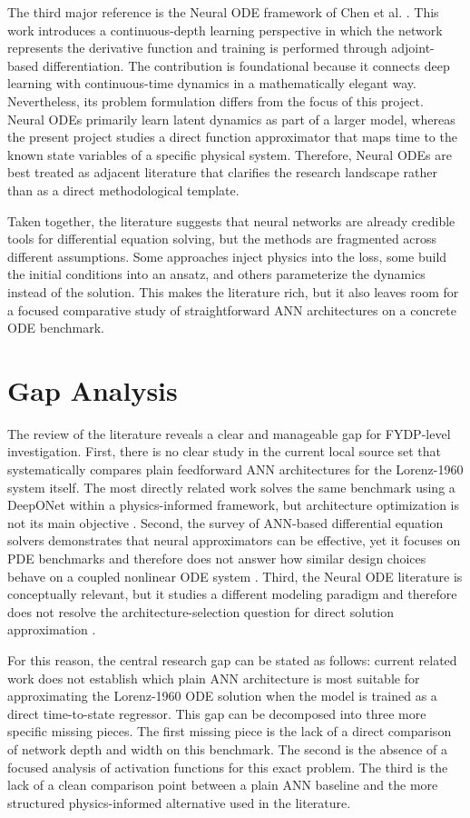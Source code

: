 The third major reference is the Neural ODE framework of Chen et al. \cite{chen2019neural}. This work introduces a continuous-depth learning perspective in which the network represents the derivative function and training is performed through adjoint-based differentiation. The contribution is foundational because it connects deep learning with continuous-time dynamics in a mathematically elegant way. Nevertheless, its problem formulation differs from the focus of this project. Neural ODEs primarily learn latent dynamics as part of a larger model, whereas the present project studies a direct function approximator that maps time to the known state variables of a specific physical system. Therefore, Neural ODEs are best treated as adjacent literature that clarifies the research landscape rather than as a direct methodological template.

Taken together, the literature suggests that neural networks are already credible tools for differential equation solving, but the methods are fragmented across different assumptions. Some approaches inject physics into the loss, some build the initial conditions into an ansatz, and others parameterize the dynamics instead of the solution. This makes the literature rich, but it also leaves room for a focused comparative study of straightforward ANN architectures on a concrete ODE benchmark.

\section{Gap Analysis}
The review of the literature reveals a clear and manageable gap for FYDP-level investigation. First, there is no clear study in the current local source set that systematically compares plain feedforward ANN architectures for the Lorenz-1960 system itself. The most directly related work solves the same benchmark using a DeepONet within a physics-informed framework, but architecture optimization is not its main objective \cite{matthews2025pinnde}. Second, the survey of ANN-based differential equation solvers demonstrates that neural approximators can be effective, yet it focuses on PDE benchmarks and therefore does not answer how similar design choices behave on a coupled nonlinear ODE system \cite{pratama2022ann}. Third, the Neural ODE literature is conceptually relevant, but it studies a different modeling paradigm and therefore does not resolve the architecture-selection question for direct solution approximation \cite{chen2019neural}.

For this reason, the central research gap can be stated as follows: current related work does not establish which plain ANN architecture is most suitable for approximating the Lorenz-1960 ODE solution when the model is trained as a direct time-to-state regressor. This gap can be decomposed into three more specific missing pieces. The first missing piece is the lack of a direct comparison of network depth and width on this benchmark. The second is the absence of a focused analysis of activation functions for this exact problem. The third is the lack of a clean comparison point between a plain ANN baseline and the more structured physics-informed alternative used in the literature.

